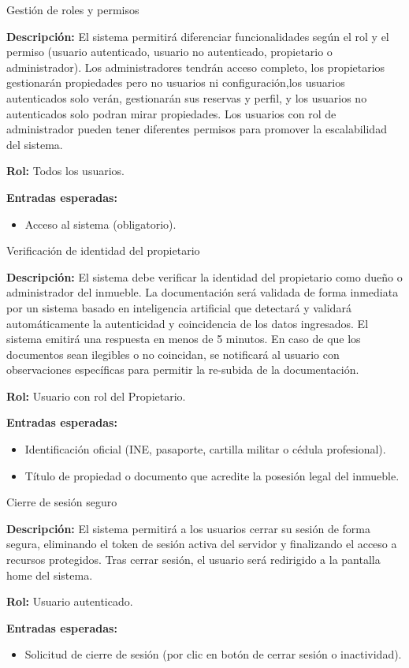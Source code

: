\begin{requisito}{Gestión de roles y permisos}
	\item \textbf{Descripción:} El sistema permitirá diferenciar funcionalidades según el rol y el permiso (usuario autenticado, usuario no autenticado, propietario o administrador). Los administradores tendrán acceso completo, los propietarios gestionarán propiedades pero no usuarios ni configuración,los usuarios autenticados solo verán, gestionarán sus reservas y perfil, y los usuarios no autenticados solo podran mirar propiedades. Los usuarios con rol de administrador pueden tener diferentes permisos para promover la escalabilidad del sistema.
	\item \textbf{Rol:} Todos los usuarios.
	\item \textbf{Entradas esperadas:} 
	\begin{itemize}
		\item Acceso al sistema (obligatorio).
	\end{itemize}
\end{requisito}
\begin{requisito}{Verificación de identidad del propietario}
	\item \textbf{Descripción:} El sistema debe verificar la identidad del propietario como dueño o administrador del inmueble. La documentación será validada de forma inmediata por un sistema basado en inteligencia artificial que detectará y validará automáticamente la autenticidad y coincidencia de los datos ingresados. El sistema emitirá una respuesta en menos de 5 minutos. En caso de que los documentos sean ilegibles o no coincidan, se notificará al usuario con observaciones específicas para permitir la re-subida de la documentación.
	\item \textbf{Rol:} Usuario con rol del Propietario.
	\item \textbf{Entradas esperadas:}
	\begin{itemize}
		\item Identificación oficial (INE, pasaporte, cartilla militar o cédula profesional).
		\item Título de propiedad o documento que acredite la posesión legal del inmueble.
	\end{itemize}
\end{requisito}
\begin{requisito}{Cierre de sesión seguro}
	\item \textbf{Descripción:} El sistema permitirá a los usuarios cerrar su sesión de forma segura, eliminando el token de sesión activa del servidor y finalizando el acceso a recursos protegidos. Tras cerrar sesión, el usuario será redirigido a la pantalla home del sistema.
	\item \textbf{Rol:} Usuario autenticado.
	\item \textbf{Entradas esperadas:}
	\begin{itemize}
		\item Solicitud de cierre de sesión (por clic en botón de cerrar sesión o inactividad).
	\end{itemize}
\end{requisito}
\singlespacing